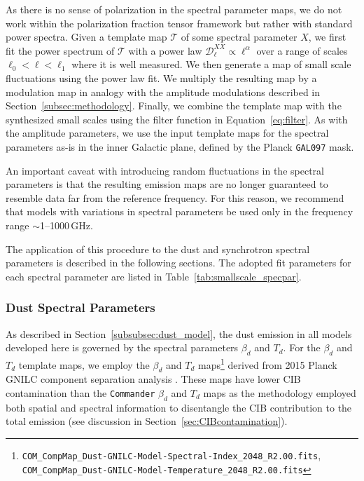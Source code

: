 \documentclass[twocolumn]{aastex631}
\begin{document}
As there is no sense of polarization in the spectral parameter maps, we do not work within the polarization fraction tensor framework but rather with standard power spectra. Given a template map $\mathcal{T}$ of some spectral parameter $X$, we first fit the power spectrum of $\mathcal{T}$ with a power law $\mathcal{D}_\ell^{XX} \propto \ell^\alpha$ over a range of scales $\ell_0 < \ell < \ell_1$ where it is well measured. We then generate a map of small scale fluctuations using the power law fit. We multiply the resulting map by a modulation map in analogy with the amplitude modulations described in Section~\ref{subsec:methodology}. Finally, we combine the template map with the synthesized small scales using the filter function in Equation~\ref{eq:filter}. As with the amplitude parameters, we use the input template maps for the spectral parameters as-is in the inner Galactic plane, defined by the Planck \texttt{GAL097} mask.

An important caveat with introducing random fluctuations in the spectral parameters is that the resulting emission maps are no longer guaranteed to resemble data far from the reference frequency. For this reason, we recommend that models with variations in spectral parameters be used only in the frequency range $\sim$1--1000\,GHz.

The application of this procedure to the dust and synchrotron spectral parameters is described in the following sections. The adopted fit parameters for each spectral parameter are listed in Table~\ref{tab:smallscale_specpar}.

\subsubsection{Dust Spectral Parameters}\label{subsec:dust_spec_params}
As described in Section~\ref{subsubsec:dust_model}, the dust emission in all models developed here is governed by the spectral parameters $\beta_d$ and $T_d$. For the $\beta_d$ and $T_d$ template maps, we employ the $\beta_d$ and $T_d$ maps\footnote{\texttt{COM\_CompMap\_Dust-GNILC-Model-Spectral-Index\_2048\_R2.00.fits}, \texttt{COM\_CompMap\_Dust-GNILC-Model-Temperature\_2048\_R2.00.fits}} derived from 2015 Planck GNILC component separation analysis \citep{planck2016-XLVIII}. These maps have lower CIB contamination than the \texttt{Commander} $\beta_d$ and $T_d$ maps \citep{planck2014-a12} as the methodology employed both spatial and spectral information to disentangle the CIB contribution to the total emission (see discussion in Section~\ref{sec:CIBcontamination}).
\end{document}
